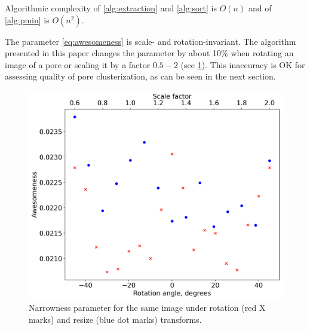 \documentclass[reprint,amsmath,amssymb,aps,pre,showkeys,showpacs]{revtex4-1}
\begin{document}
Algorithmic complexity of \ref{alg:extraction} and \ref{alg:sort} is $O(n)$ and
of \ref{alg:pmin} is $O(n^2)$.

The parameter \cref{eq:awesomeness} is scale- and rotation-invariant. The
algorithm presented in this paper changes the parameter by about 10\% when
rotating an image of a pore or scaling it by a factor $0.5-2$ (see
\cref{fig:rotation-resize}). This inaccuracy is OK for assessing quality of pore
clusterization, as can be seen in the next section.
\begin{figure}
  \centering
  \includegraphics[width=0.9\linewidth]{images/rotation-resize.png}
  \caption[]{Narrowness parameter for the same image under rotation (red X
    marks) and resize (blue dot marks) transforms.}
  \label{fig:rotation-resize}
\end{figure}
\end{document}
